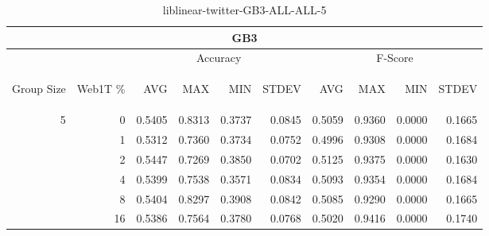 \begin{center}
\begin{table}[htbp]
\begin{tabular}{ | r | r | r | r | r | r | r | r | r | r |}
\hline
\multicolumn{10}{|c|}{GB3}\\
\hline
 & & \multicolumn{4}{|c|}{Accuracy} & \multicolumn{4}{|c|}{F-Score}\\ \cline{3-10}
\begin{sideways}Group Size\end{sideways} & \begin{sideways}Web1T \%\end{sideways} & \begin{sideways}AVG\end{sideways} & \begin{sideways}MAX\end{sideways} & \begin{sideways}MIN\end{sideways} & \begin{sideways}STDEV\end{sideways} & \begin{sideways}AVG\end{sideways} & \begin{sideways}MAX\end{sideways} & \begin{sideways}MIN\end{sideways} & \begin{sideways}STDEV\end{sideways}\\
\hline
\multirow{6}{*}{5}
 & 0 & 0.5405 & 0.8313 & 0.3737 & 0.0845 & 0.5059 & 0.9360 & 0.0000 & 0.1665\\ \cline{2-10}
 & 1 & 0.5312 & 0.7360 & 0.3734 & 0.0752 & 0.4996 & 0.9308 & 0.0000 & 0.1684\\ \cline{2-10}
 & 2 & 0.5447 & 0.7269 & 0.3850 & 0.0702 & 0.5125 & 0.9375 & 0.0000 & 0.1630\\ \cline{2-10}
 & 4 & 0.5399 & 0.7538 & 0.3571 & 0.0834 & 0.5093 & 0.9354 & 0.0000 & 0.1684\\ \cline{2-10}
 & 8 & 0.5404 & 0.8297 & 0.3908 & 0.0842 & 0.5085 & 0.9290 & 0.0000 & 0.1665\\ \cline{2-10}
 & 16 & 0.5386 & 0.7564 & 0.3780 & 0.0768 & 0.5020 & 0.9416 & 0.0000 & 0.1740\\ \cline{2-10}
\hline
\end{tabular}
\caption{liblinear-twitter-GB3-ALL-ALL-5}
\end{table}
\end{center}

